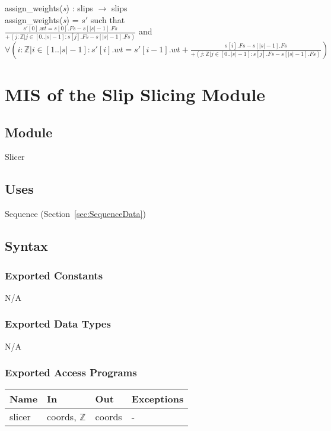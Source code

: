 \documentclass[12pt, titlepage]{article}
\begin{document}
\noindent assign\_weights(\textit{s}) : slips $\rightarrow$ slips\\
assign\_weights(\textit{s}) = $s'$ such that\\
$\frac{s'[0].wt = s[0].Fs - s[|s|-1].Fs}{+(j : \mathbb{Z} | j \in [0..|s|-1] : 
s[j].Fs - s[|s|-1].Fs)}$ and \\
$\forall(i : \mathbb{Z} | i \in [1..|s|-1] : s'[i].wt = s'[i-1].wt + 
\frac{s[i].Fs - s[|s|-1].Fs}{+(j : \mathbb{Z} | j \in [0..|s|-1] : s[j].Fs - 
s[|s|-1].Fs)})$\\


\section{MIS of the Slip Slicing Module} \label{sec:SlicerMod}

\subsection{Module}
Slicer

\subsection{Uses}
Sequence (Section~\ref{sec:SequenceData})

\subsection{Syntax}

\subsubsection{Exported Constants}
N/A

\subsubsection{Exported Data Types}
N/A

\subsubsection{Exported Access Programs}

\begin{center}
	\renewcommand*{\arraystretch}{1.5}
	\begin{tabular} {p{}  p{}  p{} 
			p{} } \hline 
		\textbf{Name} & \textbf{In} & \textbf{Out} & \textbf{Exceptions} \\ 
		\hline
		slicer & coords, $\mathbb{Z}$ & coords & - \\ \hline
		
	\end{tabular}
\end{center}
\end{document}
